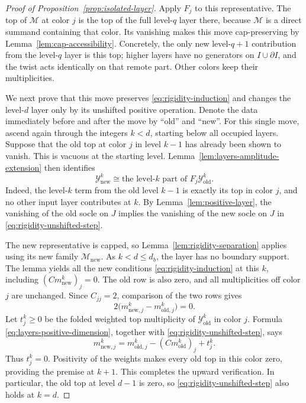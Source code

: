\begin{proof}[Proof of Proposition~\ref{prop:isolated-layer}]
Apply $F_j$ to this representative.  The top of $\mathcal M$ at color
$j$ is the top of the full level-$q$ layer there, because $\mathcal M$ is
a direct summand containing that color.  Its vanishing makes this move
cap-preserving by Lemma~\ref{lem:cap-accessibility}.  Concretely, the only
new level-$q+1$ contribution from the level-$q$ layer is this top; higher
layers have no generators on $I\cup\partial I$, and the twist acts
identically on that remote part.  Other colors keep their multiplicities.

We next prove that this move preserves
\eqref{eq:rigidity-induction} and changes the level-$d$ layer only by its
unshifted positive operation.  Denote the data immediately before and
after the move by ``old'' and ``new''.  For this single move, ascend again
through the integers $k<d$, starting below all occupied layers.  Suppose
that the old top at color $j$ in level $k-1$ has already been shown to
vanish.  This is vacuous at the starting level.
Lemma~\ref{lem:layers-amplitude-extension} then identifies
\begin{equation}
 \mathcal Y^k_{\mathrm{new}}
   \cong\text{the level-$k$ part of }F_j\mathcal Y^k_{\mathrm{old}}.
 \label{eq:rigidity-unshifted-step}
\end{equation}
Indeed, the level-$k$ term from the old level $k-1$ is exactly its top in
color $j$, and no other input layer contributes at $k$.  By
Lemma~\ref{lem:positive-layer}, the vanishing of the old socle on $J$
implies the vanishing of the new socle on $J$ in
\eqref{eq:rigidity-unshifted-step}.

The new representative is capped, so
Lemma~\ref{lem:rigidity-separation} applies using its new family
$\mathcal M_{\mathrm{new}}$.  As $k<d\le d_b$, the layer has no boundary
support.  The lemma yields all the new conditions
\eqref{eq:rigidity-induction} at this $k$, including
$(Cm^k_{\mathrm{new}})_j=0$.  The old row is also zero, and all
multiplicities off color $j$ are unchanged.  Since $C_{jj}=2$, comparison
of the two rows gives
\[
 2\bigl(m^k_{\mathrm{new},j}-m^k_{\mathrm{old},j}\bigr)=0.
\]
Let $t_j^k\ge0$ be the folded weighted top multiplicity of
$\mathcal Y^k_{\mathrm{old}}$ in color $j$.  Formula
\eqref{eq:layers-positive-dimension}, together with
\eqref{eq:rigidity-unshifted-step}, says
\[
 m^k_{\mathrm{new},j}
   =m^k_{\mathrm{old},j}-(Cm^k_{\mathrm{old}})_j+t_j^k.
\]
Thus $t_j^k=0$.  Positivity of the weights makes every old top in this
color zero, providing the premise at $k+1$.  This completes the upward
verification.  In particular, the old top at level $d-1$ is zero, so
\eqref{eq:rigidity-unshifted-step} also holds at $k=d$.


\end{proof}
